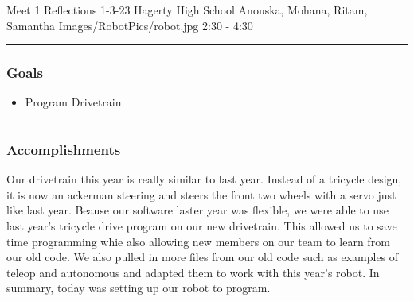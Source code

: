 \insertmeeting 
	{Meet 1 Reflections} 
	{1-3-23} 
	{Hagerty High School}
	{Anouska, Mohana, Ritam, Samantha}
	{Images/RobotPics/robot.jpg}
	{2:30 - 4:30}
	
\noindent\hfil\rule{\textwidth}{.4pt}\hfil
\subsubsection*{Goals}
\begin{itemize}
    \item Program Drivetrain



\end{itemize} 

\noindent\hfil\rule{\textwidth}{.4pt}\hfil

\subsubsection*{Accomplishments}
Our drivetrain this year is really similar to last year. Instead of a tricycle design, it is now an ackerman steering and steers the front two wheels with a servo just like last year. Beause our software laster year was flexible, we were able to use last year's tricycle drive program on our new drivetrain. This allowed us to save time programming whie also allowing new members on our team to learn from our old code. We also pulled in more files from our old code such as examples of teleop and autonomous and adapted them to work with this year's robot. In summary, today was setting up our robot to program.

 

